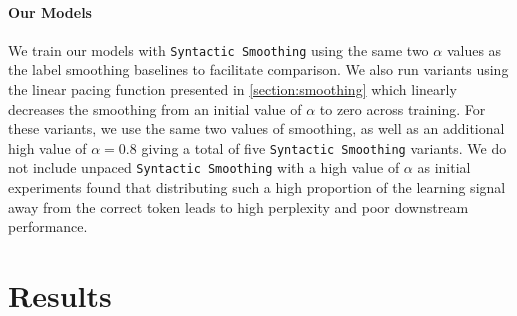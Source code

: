 \paragraph{Our Models} We train our models with \texttt{Syntactic Smoothing} using the same two $\alpha$ values as the label smoothing baselines to facilitate comparison. We also run variants using the linear pacing function presented in \cref{section:smoothing} which linearly decreases the smoothing from an initial value of $\alpha$ to zero across training. For these variants, we use the same two values of smoothing, as well as an additional high value of $\alpha=0.8$ giving a total of five \texttt{Syntactic Smoothing} variants. We do not include unpaced \texttt{Syntactic Smoothing} with a high value of $\alpha$ as initial experiments found that distributing such a high proportion of the learning signal away from the correct token leads to high perplexity and poor downstream performance.

\section{Results}
\label{sec:results}

